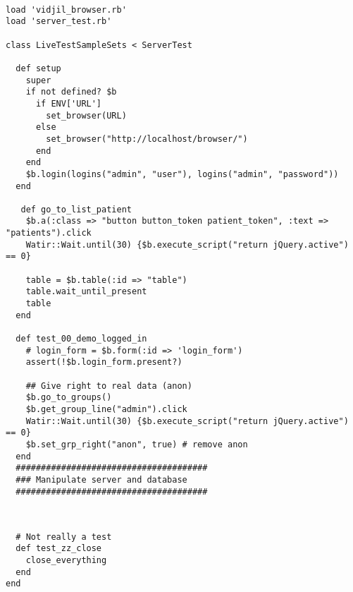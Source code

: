 
\begin{verbatim}

load 'vidjil_browser.rb'
load 'server_test.rb'

class LiveTestSampleSets < ServerTest

  def setup
    super
    if not defined? $b
      if ENV['URL']
        set_browser(URL)
      else
        set_browser("http://localhost/browser/")
      end
    end
    $b.login(logins("admin", "user"), logins("admin", "password"))
  end

   def go_to_list_patient
    $b.a(:class => "button button_token patient_token", :text => "patients").click
    Watir::Wait.until(30) {$b.execute_script("return jQuery.active") == 0}

    table = $b.table(:id => "table")
    table.wait_until_present
    table
  end

  def test_00_demo_logged_in
    # login_form = $b.form(:id => 'login_form')
    assert(!$b.login_form.present?)

    ## Give right to real data (anon)
    $b.go_to_groups()
    $b.get_group_line("admin").click
    Watir::Wait.until(30) {$b.execute_script("return jQuery.active") == 0}
    $b.set_grp_right("anon", true) # remove anon
  end
  ######################################
  ### Manipulate server and database
  ######################################


\end{verbatim}



\begin{verbatim}

  # Not really a test
  def test_zz_close
    close_everything
  end
end
\end{verbatim}
